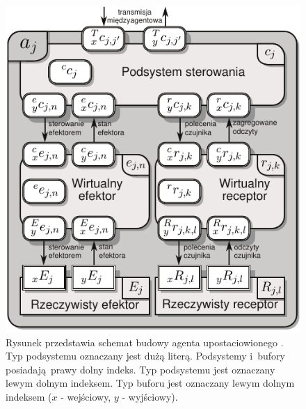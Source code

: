 \begin{figure}
	\centering
	\includegraphics[width=.6\textwidth]{images/agent_structure.pdf}
	\caption{Rysunek przedstawia schemat budowy agenta upostaciowionego \cite{bib:Zielinski:2014_kkr_relacje-twiki}. Typ podsystemu oznaczany jest dużą literą. Podsystemy i~bufory posiadają prawy dolny indeks. Typ podsystemu jest oznaczany lewym dolnym indeksem.  Typ buforu jest oznaczany lewym dolnym indeksem ($x$ - wejściowy, $y$ - wyjściowy).}
	\label{fig:upostaciowiony}
\end{figure}